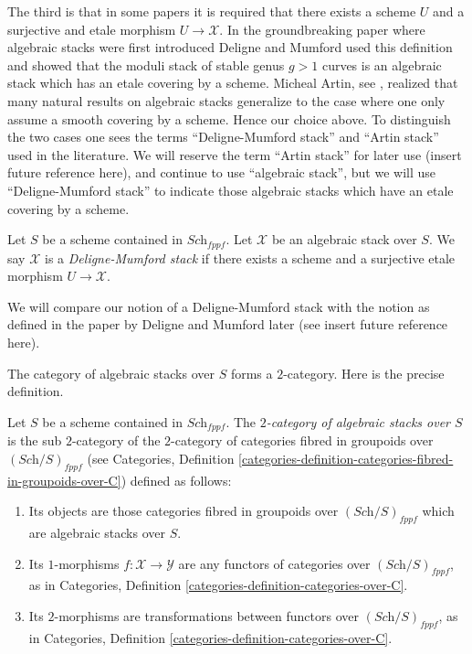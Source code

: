 \medskip\noindent
The third is that in some papers it is required that there exists a
scheme $U$ and a surjective and etale morphism $U \to \mathcal{X}$.
In the groundbreaking paper \cite{DM} where algebraic stacks were first
introduced Deligne and Mumford used this definition and showed that
the moduli stack of stable genus $g > 1$ curves is an algebraic stack 
which has an etale covering by a scheme. Micheal Artin, see
\cite{artin_versal}, realized that many
natural results on algebraic stacks generalize to the case where one
only assume a smooth covering by a scheme. Hence our choice above.
To distinguish the two cases one sees the terms ``Deligne-Mumford stack''
and ``Artin stack'' used in the literature. We will reserve the term
``Artin stack'' for later use (insert future reference here), and continue
to use ``algebraic stack'', but we will use ``Deligne-Mumford stack''
to indicate those algebraic stacks which have an etale covering by a
scheme.

\begin{definition}
\label{definition-deligne-mumford}
Let $S$ be a scheme contained in $\textit{Sch}_{fppf}$.
Let $\mathcal{X}$ be an algebraic stack over $S$.
We say $\mathcal{X}$ is a {\it Deligne-Mumford stack} if there exists
a scheme and a surjective etale morphism $U \to \mathcal{X}$.
\end{definition}

\noindent
We will compare our notion of a Deligne-Mumford stack with
the notion as defined in the paper by Deligne and Mumford later
(see insert future reference here).

\medskip\noindent
The category of algebraic stacks over $S$ forms a $2$-category.
Here is the precise definition.

\begin{definition}
\label{definition-morphism-algebraic-stacks}
Let $S$ be a scheme contained in $\textit{Sch}_{fppf}$.
The {\it $2$-category of algebraic stacks over $S$} is the
sub $2$-category of the $2$-category of categories fibred in
groupoids over $(\textit{Sch}/S)_{fppf}$ (see
Categories,
Definition \ref{categories-definition-categories-fibred-in-groupoids-over-C})
defined as follows:
\begin{enumerate}
\item Its objects are those categories fibred in groupoids
over $(\textit{Sch}/S)_{fppf}$ which are algebraic stacks over $S$.
\item Its $1$-morphisms $f : \mathcal{X} \to \mathcal{Y}$ are
any functors of categories over $(\textit{Sch}/S)_{fppf}$, as in
Categories, Definition \ref{categories-definition-categories-over-C}.
\item Its $2$-morphisms are transformations between functors
over $(\textit{Sch}/S)_{fppf}$, as in
Categories, Definition \ref{categories-definition-categories-over-C}.
\end{enumerate}
\end{definition}

